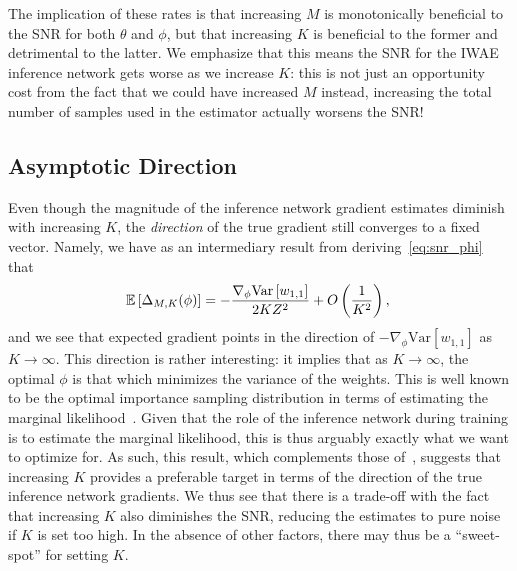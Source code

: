 The implication of these rates is that increasing $M$ is monotonically beneficial to
the \gls{SNR} for both $\theta$ and $\phi$, but that increasing $K$ is beneficial to the
former and detrimental to the latter.  We emphasize that this means the \gls{SNR} for the \gls{IWAE} inference network
gets worse as we increase $K$: this is not just an opportunity cost
from the fact that we could have increased $M$ instead, increasing the total number of samples
used in the estimator actually worsens the \gls{SNR}!

\subsection{Asymptotic Direction}
\label{sec:dir}

Even though the magnitude of the inference
network gradient estimates diminish with increasing $K$, the \emph{direction}
of the true gradient still converges to a fixed vector.
Namely, we have as an intermediary result from deriving~\eqref{eq:snr_phi}
that
\begin{align}
\label{eq:expt}
\hspace{-3pt}
\mathbb{E} \left[\Delta_{M,K} (\phi)\right] = -\frac{\nabla_{\phi} \text{Var}\left[w_{1,1}\right]}{2K Z^2} 
+O\left(\frac{1}{K^2}\right),
\end{align}
and we see that expected gradient points in the direction of
$-\nabla_{\phi} \text{Var}\left[w_{1,1}\right]$ as $K \to \infty$.  
This direction is rather interesting: it implies that as $K\to\infty$, the optimal $\phi$
is that which minimizes the variance of the weights.  This is well known to be 
the optimal importance sampling
distribution in terms of estimating the marginal likelihood~\citep{Mcbook}.
Given that the role of the inference network during training is to estimate the
marginal likelihood, this is thus arguably exactly what we want to optimize for.  
As such, this result, which complements those
of~\cite{Cremer2017reinterpreting}, suggests that increasing 
$K$ provides a preferable target in terms of the direction of the
true inference network gradients.  We thus see that there is a trade-off with the fact that increasing $K$ also diminishes
the \gls{SNR}, reducing the estimates to pure noise if $K$ is
set too high.   In the absence of other factors, there may thus be a ``sweet-spot'' for 
setting $K$.

